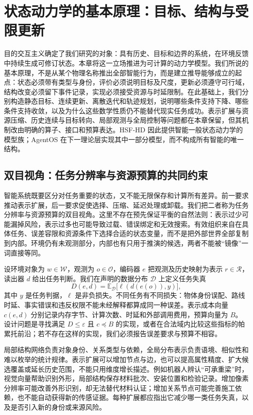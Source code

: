 \chapter{状态动力学的基本原理：目标、结构与受限更新}
\label{chp:first_principles}

目的交互主义确定了我们研究的对象：具有历史、目标和边界的系统，在环境反馈中持续生成可修订状态。本章将这一立场推进为可计算的动力学模型。我们所说的基本原理，不是从某个物理名称推出全部智能行为，而是建立推导能够成立的起点：状态必须带有类型与身份，评价必须说明目标及尺度，更新必须遵守可行域，结构改变必须留下事件记录，实现必须接受资源与时延限制。在此基础上，我们分别构造静态目标、连续更新、离散迭代和轨迹规划，说明哪些条件支持下降、哪些条件支持收敛，以及为什么这些数学性质仍不能替代现实任务成功。表示扩展与资源压缩、历史连续与目标转向、局部观测与全局控制等问题都在本章保留，但其机制改由明确的算子、接口和预算表达。HSF-HD 因此提供智能一般状态动力学的模型族；AgentOS 在下一理论层实现其中一部分模型，而不构成所有智能的唯一结构。

\section{双目视角：任务分辨率与资源预算的共同约束}
\label{sec:section_3791}

智能系统既要区分对任务重要的状态，又不能无限保存和计算所有差异。前一要求推动表示扩展，后一要求促使选择、压缩、延迟处理或卸载。我们把二者称为任务分辨率与资源预算的双目视角。这里不存在预先保证平衡的自然法则：表示过少可能漏掉风险，表示过多也可能导致过载、错误绑定和无效搜索。有效组织来自在具体任务、误差容限和资源条件下选择合适的状态变量，而不是把外部世界全部复制到内部。环境仍有未观测部分，内部也有只用于推演的候选，两者不能被“镜像”一词直接等同。

设环境对象为 $w\in\mathcal W$，观测为 $o\in\mathcal O$，编码器 $e$ 把观测及历史映射为表示 $r\in\mathcal R$，读出器 $d$ 给出任务判断。我们在声明的数据分布 $\mathcal D$ 上定义任务失真
\begin{equation}
 D(e,d)=\mathbb E_{\mathcal D}
 \bigl[\ell(d(e(o)),y)\bigr],
\end{equation}
其中 $y$ 是任务判据，$\ell$ 是非负损失。不同任务有不同损失：物体身份误配、路线时延、事实错误和违反权限不能未经解释都算成同一种误差。表示成本向量 $c(e,d)$ 分别记录内存字节、计算次数、时延和外部调用费用，预算向量为 $B$。设计问题是寻找满足 $D\le\varepsilon$ 且 $c\preceq B$ 的实现，或者在合法域内比较这些指标的帕累托前沿；若不存在这样的实现，我们必须报告误差要求与预算不相容。

局部结构网络负责对象身份、关系类型与依赖，全局分布表示负责语境、相似性和难以枚举的统计规律。表示扩展可以增加节点与边，也可以提高属性精度、扩大候选覆盖或延长历史范围，不能只用维度增长描述。例如机器人辨认“可承重梁”时，视觉向量帮助识别外形，局部结构保存材料批次、安装位置和检验记录。增加像素分辨率可能改善外形识别，却无法替代材料认证；增加关系节点可能完善施工依赖，也不能自动获得新的传感证据。每种扩展都应指出它减少哪一类任务失真，以及是否引入新的身份或来源风险。

